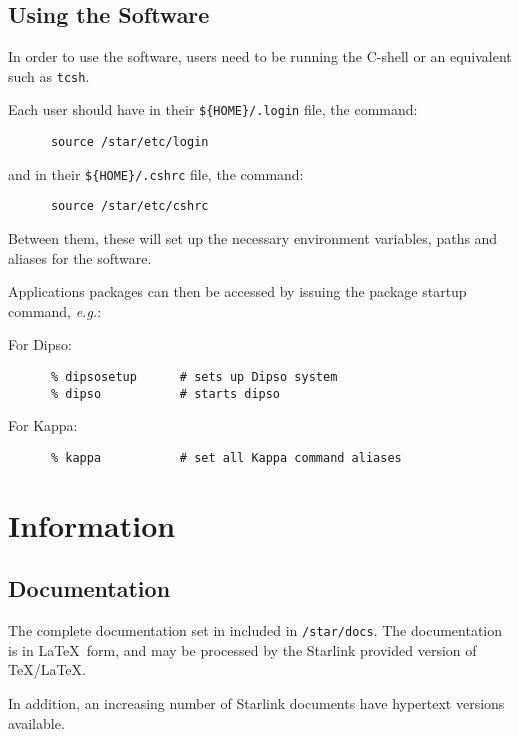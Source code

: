 \subsection{Using the Software}
\label{s:setup:using}

In order to use the software, users need to be running the C-shell or
an equivalent such as {\tt tcsh}.

Each user should have in their {\tt \$\{HOME\}/.login} file, the command:

\begin{verbatim}
      source /star/etc/login
\end{verbatim}

and in their {\tt \$\{HOME\}/.cshrc} file, the command:

\begin{verbatim}
      source /star/etc/cshrc
\end{verbatim}

Between them, these will set up the necessary environment variables,
paths and aliases for the software.

Applications packages can then be accessed by issuing the package
startup command, {\em e.g.}:

For Dipso:

\begin{verbatim}
      % dipsosetup      # sets up Dipso system
      % dipso           # starts dipso
\end{verbatim}

For Kappa:

\begin{verbatim}
      % kappa           # set all Kappa command aliases
\end{verbatim}


\section{Information}
\label{s:info}

\subsection{Documentation}
\label{s:info:docs}

The complete documentation set in included in {\tt /star/docs}.  The
documentation is in \LaTeX\ form, and may be processed by the Starlink
provided version of \TeX/\LaTeX.

In addition, an increasing number of Starlink documents have hypertext 
versions available.

